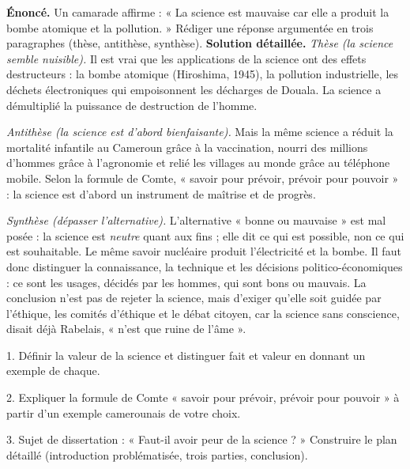 \documentclass[11pt]{article}
\begin{document}
\begin{exoresolu}
\textbf{Énoncé.} Un camarade affirme : « La science est mauvaise car elle a produit la bombe atomique et la pollution. » Rédiger une réponse argumentée en trois paragraphes (thèse, antithèse, synthèse).
\tcblower
\textbf{Solution détaillée.}
\emph{Thèse (la science semble nuisible).} Il est vrai que les applications de la science ont des effets destructeurs : la bombe atomique (Hiroshima, 1945), la pollution industrielle, les déchets électroniques qui empoisonnent les décharges de Douala. La science a démultiplié la puissance de destruction de l'homme.

\emph{Antithèse (la science est d'abord bienfaisante).} Mais la même science a réduit la mortalité infantile au Cameroun grâce à la vaccination, nourri des millions d'hommes grâce à l'agronomie et relié les villages au monde grâce au téléphone mobile. Selon la formule de Comte, « savoir pour prévoir, prévoir pour pouvoir » : la science est d'abord un instrument de maîtrise et de progrès.

\emph{Synthèse (dépasser l'alternative).} L'alternative « bonne ou mauvaise » est mal posée : la science est \emph{neutre} quant aux fins ; elle dit ce qui est possible, non ce qui est souhaitable. Le même savoir nucléaire produit l'électricité et la bombe. Il faut donc distinguer la connaissance, la technique et les décisions politico-économiques : ce sont les usages, décidés par les hommes, qui sont bons ou mauvais. La conclusion n'est pas de rejeter la science, mais d'exiger qu'elle soit guidée par l'éthique, les comités d'éthique et le débat citoyen, car la science sans conscience, disait déjà Rabelais, « n'est que ruine de l'âme ».
\end{exoresolu}

\begin{exercice}
1. Définir la valeur de la science et distinguer fait et valeur en donnant un exemple de chaque.

2. Expliquer la formule de Comte « savoir pour prévoir, prévoir pour pouvoir » à partir d'un exemple camerounais de votre choix.

3. Sujet de dissertation : « Faut-il avoir peur de la science ? » Construire le plan détaillé (introduction problématisée, trois parties, conclusion).
\end{exercice}
\end{document}
